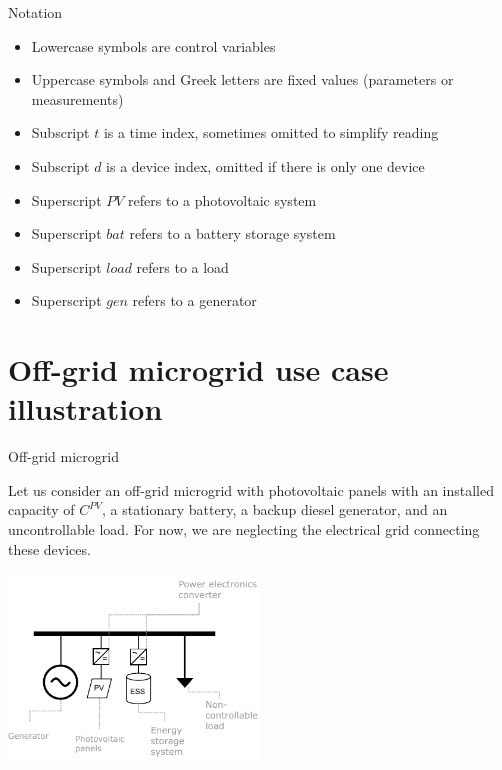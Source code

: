 \begin{frame}{Notation}
\begin{itemize}
    \item Lowercase symbols are control variables
    \item Uppercase symbols and Greek letters are fixed values (parameters or measurements)
    \item Subscript $t$ is a time index, sometimes omitted to simplify reading
    \item Subscript $d$ is a device index, omitted if there is only one device
    \item Superscript $PV$ refers to a photovoltaic system
    \item Superscript $bat$ refers to a battery storage system
    \item Superscript $load$ refers to a load
    \item Superscript $gen$ refers to a generator
\end{itemize}
    

\end{frame}


\section{Off-grid microgrid use case illustration}
\begin{frame}{Off-grid microgrid}
    \begin{multicols}{2}
        
    
    Let us consider an off-grid microgrid with photovoltaic panels with an installed capacity of $C^{PV}$, a stationary battery, a backup diesel generator, and an uncontrollable load. For now, we are neglecting the electrical grid connecting these devices.

    \begin{center}
    \includegraphics[width=0.5\textwidth]{images/off_grid_1.pdf}        
    \end{center}
\end{multicols}
\end{frame}

